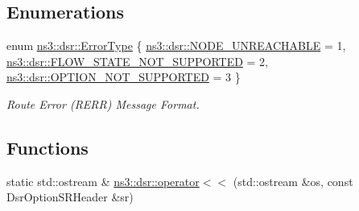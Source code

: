 \subsection*{Enumerations}
\begin{DoxyCompactItemize}
\item 
enum \hyperlink{group__dsr_ga40f62a50dc031f2853e92211aad095f4}{ns3\+::dsr\+::\+Error\+Type} \{ \hyperlink{group__dsr_gga40f62a50dc031f2853e92211aad095f4adf3df5290f2b4d470e5ea842c44b32e5}{ns3\+::dsr\+::\+N\+O\+D\+E\+\_\+\+U\+N\+R\+E\+A\+C\+H\+A\+B\+LE} = 1, 
\hyperlink{group__dsr_gga40f62a50dc031f2853e92211aad095f4a7031ed624684291a4edb70f1edba2c58}{ns3\+::dsr\+::\+F\+L\+O\+W\+\_\+\+S\+T\+A\+T\+E\+\_\+\+N\+O\+T\+\_\+\+S\+U\+P\+P\+O\+R\+T\+ED} = 2, 
\hyperlink{group__dsr_gga40f62a50dc031f2853e92211aad095f4ae18b545e5cad7897bb7182cad1111eec}{ns3\+::dsr\+::\+O\+P\+T\+I\+O\+N\+\_\+\+N\+O\+T\+\_\+\+S\+U\+P\+P\+O\+R\+T\+ED} = 3
 \}\begin{DoxyCompactList}\small\item\em Route Error (R\+E\+RR) Message Format. \end{DoxyCompactList}
\end{DoxyCompactItemize}
\subsection*{Functions}
\begin{DoxyCompactItemize}
\item 
static std\+::ostream \& \hyperlink{namespacens3_1_1dsr_a2c17213207d836351d0c0808745d0b94}{ns3\+::dsr\+::operator$<$$<$} (std\+::ostream \&os, const Dsr\+Option\+S\+R\+Header \&sr)
\end{DoxyCompactItemize}
